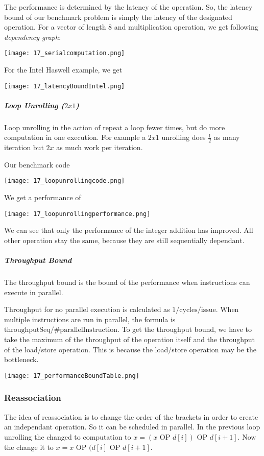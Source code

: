 The performance is determined by the latency of the operation. So, the latency bound of our benchmark problem is simply the latency of the designated operation. For a vector of length $8$ and multiplication operation, we get following \textit{dependency graph}:

\texttt{[image: 17\_serialcomputation.png]}

For the Intel Haswell example, we get

\texttt{[image: 17\_latencyBoundIntel.png]}

\subparagraph{Loop Unrolling ($2x1$)}
Loop unrolling in the action of repeat a loop fewer times, but do more computation in one execution. For example a $2x1$ unrolling does $\frac{1}{2}$ as many iteration but $2x$ as much work per iteration.

Our benchmark code

\texttt{[image: 17\_loopunrollingcode.png]}

We get a performance of 

\texttt{[image: 17\_loopunrollingperformance.png]}

We can see that only the performance of the integer addition has improved. All other operation stay the same, because they are still sequentially dependant.


\subparagraph{Throughput Bound}
The throughput bound is the bound of the performance when instructions can execute in parallel.

Throughput for no parallel execution is calculated as $1 / \text{cycles/issue}$. When multiple instructions are run in parallel, the formula is $\text{throughputSeq} / \text{\#parallelInstruction}$. To get the throughput bound, we have to take the maximum of the throughput of the operation itself and the throughput of the load/store operation. This is because the load/store operation may be the bottleneck.

\texttt{[image: 17\_performanceBoundTable.png]}

\subsubsection{Reassociation}
The idea of reassociation is to change the order of the brackets in order to create an independant operation. So it can be scheduled in parallel. In the previous loop unrolling the changed to computation to $x = (x \text{ OP } d[i]) \text{ OP } d[i + 1]$. Now the change it to $x = x \text{ OP } (d[i] \text{ OP } d[i + 1]$.


